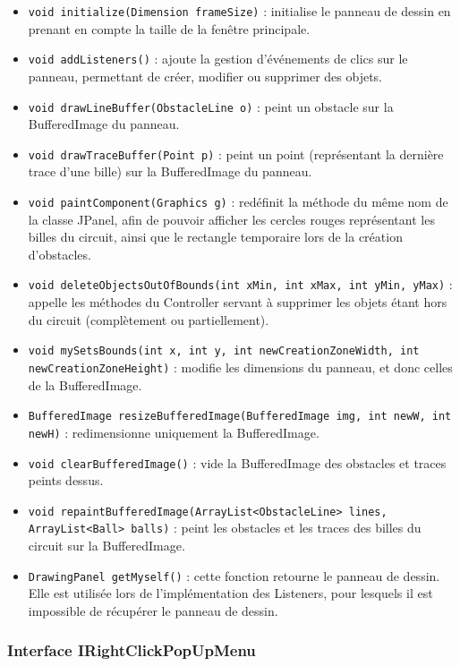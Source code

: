 \documentclass{report}
\begin{document}
\begin{itemize}
\item \texttt{void initialize(Dimension frameSize)} : initialise le panneau de dessin en prenant en compte la taille de la fenêtre principale.
\item \texttt{void addListeners()} : ajoute la gestion d'événements de clics sur le panneau, permettant de créer, modifier ou supprimer des objets.
\item \texttt{void drawLineBuffer(ObstacleLine o)} : peint un obstacle sur la BufferedImage du panneau.
\item \texttt{void drawTraceBuffer(Point p)} : peint un point (représentant la dernière trace d'une bille) sur la BufferedImage du panneau.
\item \texttt{void paintComponent(Graphics g)} : redéfinit la méthode du même nom de la classe JPanel, afin de pouvoir afficher les cercles rouges représentant les billes du circuit, ainsi que le rectangle temporaire lors de la création d'obstacles.
\item \texttt{void deleteObjectsOutOfBounds(int xMin, int xMax, int yMin, yMax)} : appelle les méthodes du Controller servant à supprimer les objets étant hors du circuit (complètement ou partiellement).
\item \texttt{void mySetsBounds(int x, int y, int newCreationZoneWidth, int newCreationZoneHeight)} : modifie les dimensions du panneau, et donc celles de la BufferedImage.
\item \texttt{BufferedImage resizeBufferedImage(BufferedImage img, int newW, int newH)} :  redimensionne uniquement la BufferedImage.
\item \texttt{void clearBufferedImage()} : vide la BufferedImage des obstacles et traces peints dessus.
\item \texttt{void repaintBufferedImage(ArrayList<ObstacleLine> lines, ArrayList<Ball> balls)} : peint les obstacles et les traces des billes du circuit sur la BufferedImage.
\item \texttt{DrawingPanel getMyself()} : cette fonction retourne le panneau de dessin. Elle est utilisée lors de l'implémentation des Listeners, pour lesquels il est impossible de récupérer le panneau de dessin.
\end{itemize}

\subsubsection{Interface IRightClickPopUpMenu}
\end{document}
